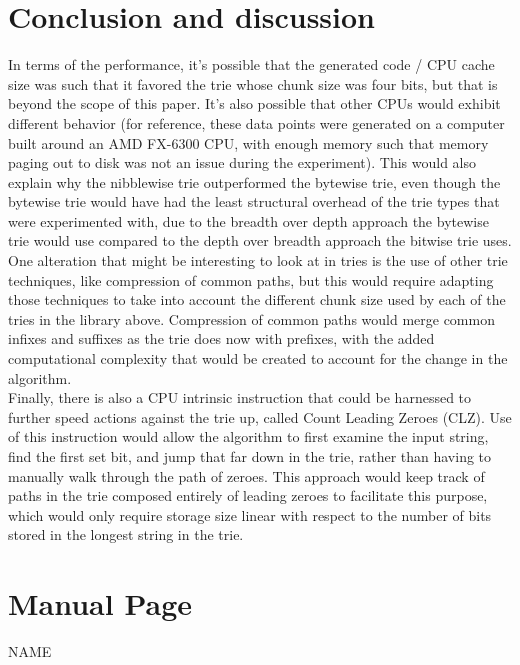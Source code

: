 \documentclass{llncs}
\begin{document}
\section{Conclusion and discussion}
In terms of the performance, it's possible that the generated code / CPU cache size was such that it favored the trie whose chunk size was four bits, but that is beyond the scope of this paper. It's also possible that other CPUs would exhibit different behavior (for reference, these data points were generated on a computer built around an AMD FX-6300 CPU, with enough memory such that memory paging out to disk was not an issue during the experiment). This would also explain why the nibblewise trie outperformed the bytewise trie, even though the bytewise trie would have had the least structural overhead of the trie types that were experimented with, due to the breadth over depth approach the bytewise trie would use compared to the depth over breadth approach the bitwise trie uses.\\

One alteration that might be interesting to look at in tries is the use of other trie techniques, like compression of common paths, but this would require adapting those techniques to take into account the different chunk size used by each of the tries in the library above. Compression of common paths would merge common infixes and suffixes as the trie does now with prefixes, with the added computational complexity that would be created to account for the change in the algorithm.\\

Finally, there is also a CPU intrinsic instruction that could be harnessed to further speed actions against the trie up, called Count Leading Zeroes (CLZ). Use of this instruction would allow the algorithm to first examine the input string, find the first set bit, and jump that far down in the trie, rather than having to manually walk through the path of zeroes. This approach would keep track of paths in the trie composed entirely of leading zeroes to facilitate this purpose, which would only require storage size linear with respect to the number of bits stored in the longest string in the trie. \\
\newpage
\section{Manual Page}
\noindent NAME
\end{document}
